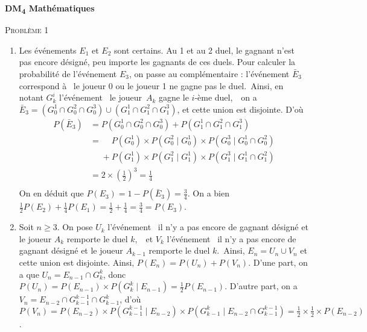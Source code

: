 \documentclass[a4paper]{article}
\begin{document}
	\begin{center}
		\Huge \textbf{DM\textsubscript4 Mathématiques}
	\end{center}

	\begin{center}
		\LARGE \textsc{Problème 1}
	\end{center}
	
	\begin{enumerate}
		\item Les événements $E_1$\/ et $E_2$\/ sont certains. Au 1 et au 2 duel, le gagnant n'est pas encore désigné, peu importe les gagnants de ces duels. Pour calculer la probabilité de l'événement $E_3$, on passe au complémentaire : l'événement $\bar{E}_3$\/ correspond à \guillemotleft~le joueur 0 ou le joueur 1 ne gagne pas le duel.~\guillemotright\@ Ainsi, en notant $G^i_k$\/ l'événement \guillemotleft~le joueur~$A_k$\/ gagne le $i$-ème duel,~\guillemotright\ on a $\bar{E}_3 = (G_0^1 \cap G_0^2 \cap G_0^3) \cup (G_1^1 \cap G_1^2 \cap G_1^3)$, et cette union est disjointe. D'où 
			\begin{align*}
				P(\bar{E}_3) &= P(G_0^1 \cap G_0^2 \cap G_0^3) + P(G_1^1 \cap G_1^2 \cap G_1^3)\\
				&= {}\mathbin{\phantom+} P(G_0^1) \times P(G_0^2  \mid G_0^1) \times P(G_0^3  \mid G_0^1 \cap G_0^2) \\
				&\mathrel{\phantom=}{} + P(G_1^1) \times P(G_1^2  \mid G_1^1) \times P(G_1^3  \mid G_1^1 \cap G_1^2)\\
				&= 2 \times \left( \frac{1}{2} \right)^3 = \frac{1}{4} \\
			\end{align*}
			On en déduit que $P(E_3) = 1 - P(\bar{E}_3) = \frac{3}{4}$.
			On a bien $\frac{1}{2}P(E_2) + \frac{1}{4}P(E_1) = \frac{1}{2} + \frac{1}{4} = \frac{3}{4} = P(E_3)$.
		\item Soit $n\ge 3$. On pose $U_k$\/ l'événement \guillemotleft~il n'y a pas encore de gagnant désigné et le joueur $A_k$\/ remporte le duel $k$,~\guillemotright\ et $V_k$\/ l'événement \guillemotleft~il n'y a pas encore de gagnant désigné et le joueur $A_{k-1}$\/ remporte le duel $k$.~\guillemotright\@ Ainsi, $E_n = U_n \cup V_n$ et cette union est disjointe. Ainsi, $P(E_n) = P(U_n) + P(V_n)$.
			D'une part, on a que $U_n = E_{n-1} \cap G^k_k$, donc $P(U_n) = P(E_{n-1}) \times P(G_k^k  \mid E_{n-1}) = \frac{1}{2}P(E_{n-1})$.
			D'autre part, on a $V_n = E_{n-2} \cap G_{k-1}^{k-1} \cap G_{k-1}^k$, d'où $P(V_n) = P(E_{n-2}) \times P(G_{k-1}^{k-1}  \mid E_{n-2}) \times P(G_{k-1}^k  \mid E_{n-2} \cap G_{k-1}^{k-1}) = \frac{1}{2} \times \frac{1}{2} \times  P(E_{n-2})$.

\end{enumerate}
\end{document}
